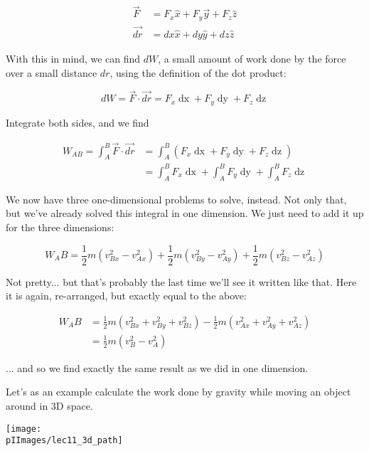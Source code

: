 \begin{align}
\vec{F}  &= F_x \hat{x} + F_y \vec{y} + F_z \hat{z}\\
\vec{dr} &= dx \hat{x} + dy \hat{y} + dz \hat{z}
\end{align}

With this in mind, we can find $dW$, a small amount of work done by the force over a small distance $dr$, using the definition of the dot product:

\begin{equation}
dW = \vec{F} \cdot \vec{dr} = F_x \mathop{dx} + F_y \mathop{dy} + F_z \mathop{dz}
\end{equation}

Integrate both sides, and we find

\begin{align}
W_{AB} = \int_A^B \vec{F} \cdot \vec{dr} &= \int_A^B \left(F_x \mathop{dx} + F_y \mathop{dy} + F_z \mathop{dz}\right)\\
                                    &= \int_A^B F_x \mathop{dx} + \int_A^B F_y \mathop{dy} + \int_A^B F_z \mathop{dz}
\end{align}

We now have three one-dimensional problems to solve, instead. Not only that, but we've already solved this integral in one dimension. We just need to add it up for the three dimensions:

\begin{equation}
W_AB = \frac{1}{2} m \left( v_{Bx}^2 - v_{Ax}^2 \right) + \frac{1}{2} m \left( v_{By}^2 - v_{Ay}^2 \right) + \frac{1}{2} m \left( v_{Bz}^2 - v_{Az}^2 \right)
\end{equation}

Not pretty... but that's probably the last time we'll see it written like that. Here it is again, re-arranged, but exactly equal to the above:

\begin{align}
W_AB &= \frac{1}{2} m \left( v_{Bx}^2 + v_{By}^2 + v_{Bz}^2 \right) - \frac{1}{2}m  \left( v_{Ax}^2 + v_{Ay}^2 + v_{Az}^2 \right)\\
     &= \frac{1}{2} m \left( v_B^2 - v_A^2 \right)
\end{align}

... and so we find exactly the same result as we did in one dimension.

Let's as an example calculate the work done by gravity while moving an object around in 3D space.

\begin{center}
\texttt{[image: \\pIImages/lec11\_3d\_path]}
\end{center}

